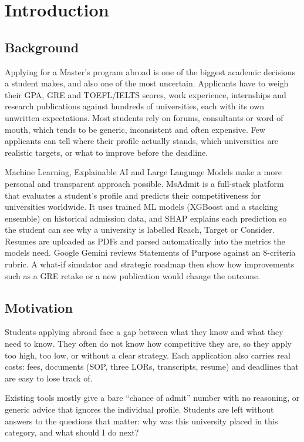 \chapter[Introduction]{\centering Introduction}\label{chap1}
\newpage

\section{Background}
\justify

Applying for a Master's program abroad is one of the biggest academic decisions a student makes, and also one of the most uncertain. Applicants have to weigh their GPA, GRE and TOEFL/IELTS scores, work experience, internships and research publications against hundreds of universities, each with its own unwritten expectations. Most students rely on forums, consultants or word of mouth, which tends to be generic, inconsistent and often expensive. Few applicants can tell where their profile actually stands, which universities are realistic targets, or what to improve before the deadline.
 
Machine Learning, Explainable AI and Large Language Models make a more personal and transparent approach possible. MsAdmit is a full-stack platform that evaluates a student's profile and predicts their competitiveness for universities worldwide. It uses trained ML models (XGBoost and a stacking ensemble) on historical admission data, and SHAP explains each prediction so the student can see why a university is labelled Reach, Target or Consider. Resumes are uploaded as PDFs and parsed automatically into the metrics the models need. Google Gemini reviews Statements of Purpose against an 8-criteria rubric. A what-if simulator and strategic roadmap then show how improvements such as a GRE retake or a new publication would change the outcome.
\section{Motivation}
\justify

Students applying abroad face a gap between what they know and what they need to know. They often do not know how competitive they are, so they apply too high, too low, or without a clear strategy. Each application also carries real costs: fees, documents (SOP, three LORs, transcripts, resume) and deadlines that are easy to lose track of.
 
Existing tools mostly give a bare ``chance of admit'' number with no reasoning, or generic advice that ignores the individual profile. Students are left without answers to the questions that matter: why was this university placed in this category, and what should I do next?
 
